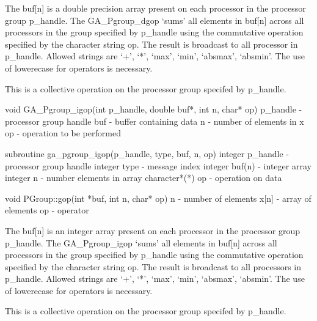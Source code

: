 \documentclass[12pt]{article}
\begin{document}
\begin{desc}

The buf[n] is a double precision array present on each processor in the processor group p_handle. The GA_Pgroup_dgop `sums' all elements in buf[n] across all processors in the group specified by p_handle using the commutative operation specified by the character string op.  The result is broadcast to all processor in p_handle. Allowed strings are `+', `*', `max', `min', `absmax', `absmin'. The use of lowerecase for operators is necessary.

This is a collective operation on the processor group specifed by p_handle. 
\end{desc}


\begin{capi}
void GA_Pgroup_igop(int p_handle, double buf*, int n, char* op)
   p_handle                      - processor group handle                  \access{[input]} 
   buf                           - buffer containing data                   
   n                             - number of elements in x                 \access{[input]} 
   op                            - operation to be performed               \access{[input]} 
\end{capi}

\begin{fapi}
subroutine ga_pgroup_igop(p_handle, type, buf, n, op)
   integer p_handle              - processor group handle                  \access{[input]} 
   integer type                  - message index                           \access{[input]} 
   integer buf(n)                - integer array                            
   integer n                     - number elements in array                \access{[input]} 
   character*(*) op              - operation on data                       \access{[input]} 
\end{fapi}

\begin{cxxapi}
void PGroup::gop(int *buf, int n, char* op)
   n              - number of elements                                     \access{[input]}
   x[n]           - array of elements                                      
   op             - operator                                               \access{[input]}
\end{cxxapi}

\begin{desc}

The buf[n] is an integer array present on each processor in the processor group p_handle. The GA_Pgroup_igop `sums' all elements in buf[n] across all processors in the group specified by p_handle using the commutative operation specified by the character string op.  The result is broadcast to all processors in p_handle. Allowed strings are `+', `*', `max', `min', `absmax', `absmin'. The use of lowerecase for operators is necessary.

This is a collective operation on the processor group specifed by p_handle. 
\end{desc}
\end{document}
